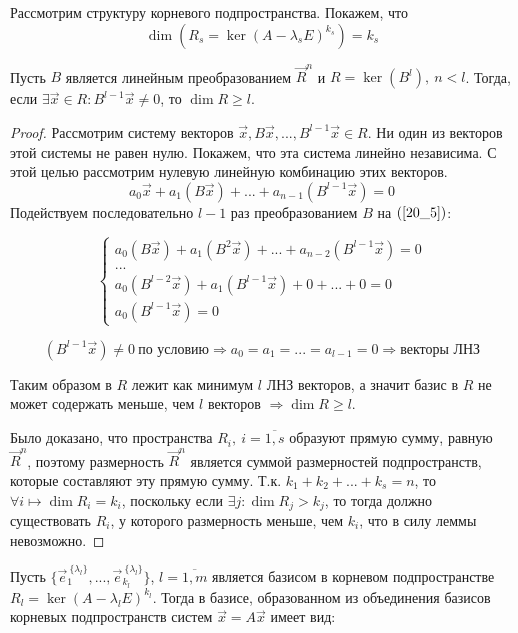 Рассмотрим структуру корневого подпространства. Покажем, что 
\[\dim(R_s = \ker(A - \lambda_s E)^{k_s}) = k_s\]

\begin{lemma}\label{lemma-20_1}
	Пусть $B$ является линейным преобразованием $\vec{R}^n$ и $R = \ker(B^l),~ n < l$. Тогда, если $\exists \vec{x} \in R: B^{l-1} \vec{x} \neq 0$, то $\dim R \geqslant l$.
	\begin{proof}
		Рассмотрим систему векторов $\vec{x}, B\vec{x}, ..., B^{l-1} \vec{x} \in R$. Ни один из векторов этой системы не равен нулю. Покажем, что эта система линейно независима. С этой целью рассмотрим нулевую линейную комбинацию этих векторов.
		\begin{equation}
			a_0 \vec{x} + a_1(B \vec{x}) + ... + a_{n-1}(B^{l-1} \vec{x}) = 0
			\label{20_5}
		\end{equation}
		Подействуем последовательно $l - 1$ раз преобразованием $B$ на $(\ref{20_5})$:
		
		\begin{equation*}
			\begin{cases}
				a_0(B \vec{x}) + a_1 (B^2 \vec{x}) + ... + a_{n-2}(B^{l-1} \vec{x}) = 0 \\
				... \\
				a_0(B^{l-2} \vec{x}) + a_1(B^{l-1} \vec{x}) + 0 + ... + 0 = 0 \\
				a_0 (B^{l-1} \vec{x}) = 0
			\end{cases}
		\end{equation*}
		
		\[(B^{l-1} \vec{x}) \neq 0 ~\text{по условию} \Rightarrow a_0 = a_1 = ... = a_{l-1} = 0 \Rightarrow \text{векторы ЛНЗ}\]
		
		Таким образом в $R$ лежит как минимум $l$ ЛНЗ векторов, а значит базис в $R$ не может содержать меньше, чем $l$ векторов $\Rightarrow \dim R \geqslant l$.
		
		Было доказано, что пространства $R_i,~ i = \overline{1,s}$ образуют прямую сумму, равную $\vec{R}^n$, поэтому размерность $\vec{R}^n$ является суммой размерностей подпространств, которые составляют эту прямую сумму. Т.к. $k_1 + k_2 + ... + k_s = n$, то $\forall i \longmapsto \dim R_i = k_i$, поскольку если $\exists j: \dim R_j > k_j$, то тогда должно существовать $R_i$, у которого размерность меньше, чем $k_i$, что в силу леммы невозможно.
	\end{proof}
\end{lemma}

Пусть $\{\vec{e}_1^{\: \{\lambda_l\}}, ... , \vec{e}_{k_l}^{\: \{\lambda_l\}}\}$, $l = \overline{1,m}$ является базисом в корневом подпространстве $R_l = \ker (A - \lambda_l E)^{k_l}$. Тогда в базисе, образованном из объединения базисов корневых подпространств систем $\vec{x} = A \vec{x}$ имеет вид:

